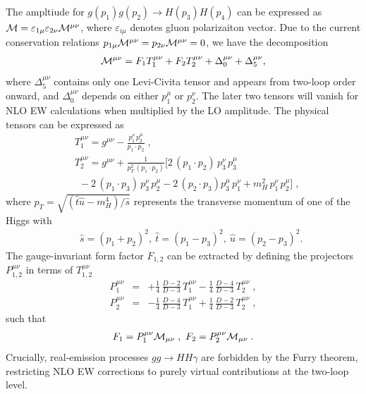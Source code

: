 The ampltiude for $g(p_1)g(p_2) \to H(p_3)H(p_4)$ can be expressed as ${\cal M}=\varepsilon_{1\mu}\varepsilon_{2\nu}{\cal M}^{\mu\nu}$, where $\varepsilon_{i\mu}$ denotes gluon polarizaiton vector. Due to the current conservation relations $p_{1\mu}{\cal M}^{\mu\nu}=p_{2\nu}{\cal M}^{\mu\nu}=0$, we have the decomposition
\begin{align}
{\cal M}^{\mu\nu}=F_1T_1 ^{\mu\nu}+F_2T_2 ^{\mu\nu}+\Delta_0^{\mu\nu}+\Delta_5^{\mu\nu},
\end{align}
where $\Delta_5^{\mu\nu}$ contains only one Levi-Civita tensor and appears from two-loop order onward, and $\Delta_0^{\mu\nu}$ depends on either $p_1^{\mu}$ or $p_2^{\nu}$. The later two tensors will vanish for NLO EW calculations when multiplied by the  LO amplitude. The physical tensors can be expressed as \cite{Plehn:1996wb}
\begin{align}
&T_1 ^{\mu\nu}= g^{\mu\nu}-\frac{p_1^{\nu}\,p_2^{\mu}}{p_1\cdot  p_2} \;,\label{eq:Ttensors} \\
&T_2 ^{\mu\nu}= g^{\mu\nu}+\frac{1}{p_{T}^{2}\,(p_1\cdot p_2)}\big[ 2\,(p_1\cdot p_2) \,p_3^{\nu}\,p_3^{\mu}\nonumber  \\
&~~ - 2\,(p_1\cdot p_3) \,p_3^{\nu}\,p_2^{\mu} -2\,(p_2\cdot p_3) p_3^{\mu}\,p_1^{\nu}+ m_H^2 \,p_1^{\nu}\,p_2^{\mu} \big] \;, 
\end{align}  
where $p_{T}=\sqrt{(\hat{t}\hat{u} - m_H^4)/\hat{s}}$ represents the transverse momentum of one of the Higgs with 
\begin{eqnarray}
&&\hat{s}=(p_1+p_2)^2,~\hat{t}=(p_1-p_3)^2,~\hat{u}=(p_2-p_3)^2.\label{st}
\end{eqnarray} 
The gauge-invariant form factor $F_{1,2}$ can be extracted by defining the projectors $P_{1,2}^{\mu\nu}$ in terms of $T_{1,2}^{\mu\nu}$
\begin{eqnarray}
P_1^{\mu\nu} &=&+\frac{1}{4}\,\frac{D-2}{D-3} \,T_1^{\mu\nu}
-\frac{1}{4}\,\frac{D-4}{D-3} \,T_2^{\mu\nu}\;,\label{eq:proj1}\\
P_2^{\mu\nu}&=& -\frac{1}{4}\,\frac{D-4}{D-3} \,T_1^{\mu\nu}
+\frac{1}{4}\,\frac{D-2}{D-3} \,T_2^{\mu\nu}\;,\label{eq:proj2}
\end{eqnarray}   
such that 
\begin{eqnarray}
F_1=P_1^{\mu\nu} {\cal M}_{\mu\nu}\;,~ F_2=P_2^{\mu\nu} {\cal M}_{\mu\nu}\;.
\end{eqnarray}
Crucially, real-emission processes $gg \to HH\gamma$ are forbidden by the Furry theorem, restricting NLO EW corrections to purely virtual contributions at the two-loop level.

